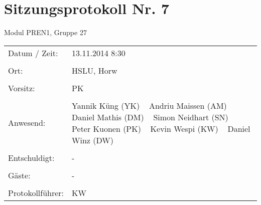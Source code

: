 \documentclass[a4paper,10pt,fleqn]{article}
\begin{document}
\section*{Sitzungsprotokoll Nr. 7}
Modul PREN1, Gruppe 27

\begin{longtable}[l]{@{}p{}@{}p{}@{}}
    Datum / Zeit: &
        13.11.2014 8:30
        \\\\
    Ort: &
        HSLU, Horw
        \\\\
    Vorsitz: &
        PK
        \\\\
    Anwesend: &
        Yannik Küng (YK) ~
        Andriu Maissen (AM) ~
        Daniel Mathis (DM) ~
        Simon Neidhart (SN) ~
        Peter Kuonen (PK) ~
        Kevin Wespi (KW) ~
        Daniel Winz (DW) ~
        \\\\
    Entschuldigt: &
        - ~
        \\\\
    Gäste: &
        - ~
        \\\\
    Protokollführer: &
        KW
        \\
\end{longtable}
%
\end{document}
